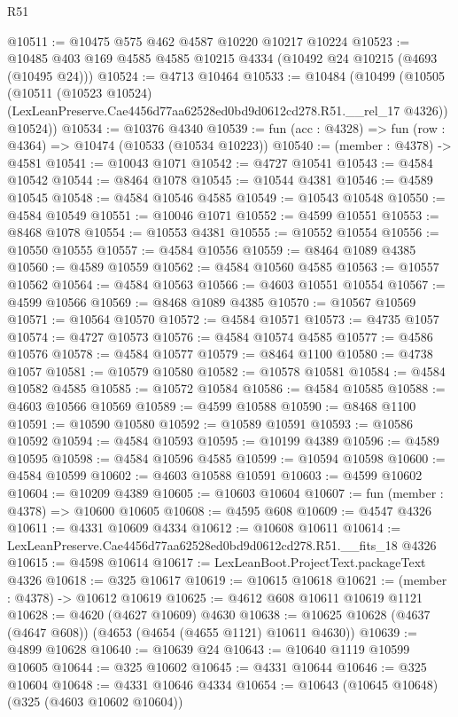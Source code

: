 \begin{lexlean}{R51}
\begin{coremodule}
@10511 := @10475 @575 @462 @4587 @10220 @10217 @10224
@10523 := @10485 @403 @169 @4585 @4585 @10215 @4334 (@10492 @24 @10215 (@4693 (@10495 @24)))
@10524 := @4713 @10464
@10533 := @10484
    (@10499
      (@10505
        (@10511
          (@10523 @10524)
          (LexLeanPreserve.Cae4456d77aa62528ed0bd9d0612cd278.R51.__rel_17 @4326))
        @10524))
@10534 := @10376 @4340
@10539 := fun (acc : @4328) => fun (row : @4364) => @10474 (@10533 (@10534 @10223))
@10540 := (member : @4378) -> @4581
@10541 := @10043 @1071
@10542 := @4727 @10541
@10543 := @4584 @10542
@10544 := @8464 @1078
@10545 := @10544 @4381
@10546 := @4589 @10545
@10548 := @4584 @10546 @4585
@10549 := @10543 @10548
@10550 := @4584 @10549
@10551 := @10046 @1071
@10552 := @4599 @10551
@10553 := @8468 @1078
@10554 := @10553 @4381
@10555 := @10552 @10554
@10556 := @10550 @10555
@10557 := @4584 @10556
@10559 := @8464 @1089 @4385
@10560 := @4589 @10559
@10562 := @4584 @10560 @4585
@10563 := @10557 @10562
@10564 := @4584 @10563
@10566 := @4603 @10551 @10554
@10567 := @4599 @10566
@10569 := @8468 @1089 @4385
@10570 := @10567 @10569
@10571 := @10564 @10570
@10572 := @4584 @10571
@10573 := @4735 @1057
@10574 := @4727 @10573
@10576 := @4584 @10574 @4585
@10577 := @4586 @10576
@10578 := @4584 @10577
@10579 := @8464 @1100
@10580 := @4738 @1057
@10581 := @10579 @10580
@10582 := @10578 @10581
@10584 := @4584 @10582 @4585
@10585 := @10572 @10584
@10586 := @4584 @10585
@10588 := @4603 @10566 @10569
@10589 := @4599 @10588
@10590 := @8468 @1100
@10591 := @10590 @10580
@10592 := @10589 @10591
@10593 := @10586 @10592
@10594 := @4584 @10593
@10595 := @10199 @4389
@10596 := @4589 @10595
@10598 := @4584 @10596 @4585
@10599 := @10594 @10598
@10600 := @4584 @10599
@10602 := @4603 @10588 @10591
@10603 := @4599 @10602
@10604 := @10209 @4389
@10605 := @10603 @10604
@10607 := fun (member : @4378) => @10600 @10605
@10608 := @4595 @608
@10609 := @4547 @4326
@10611 := @4331 @10609 @4334
@10612 := @10608 @10611
@10614 := LexLeanPreserve.Cae4456d77aa62528ed0bd9d0612cd278.R51.__fits_18 @4326
@10615 := @4598 @10614
@10617 := LexLeanBoot.ProjectText.packageText @4326
@10618 := @325 @10617
@10619 := @10615 @10618
@10621 := (member : @4378) -> @10612 @10619
@10625 := @4612 @608 @10611 @10619 @1121
@10628 := @4620 (@4627 @10609) @4630
@10638 := @10625 @10628 (@4637 (@4647 @608)) (@4653 (@4654 (@4655 @1121) @10611 @4630))
@10639 := @4899 @10628
@10640 := @10639 @24
@10643 := @10640 @1119 @10599 @10605
@10644 := @325 @10602
@10645 := @4331 @10644
@10646 := @325 @10604
@10648 := @4331 @10646 @4334
@10654 := @10643 (@10645 @10648) (@325 (@4603 @10602 @10604))

\end{coremodule}
\end{lexlean}
